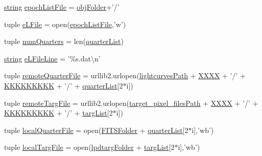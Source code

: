 \begin{DoxyCompactItemize}
\hyperlink{namespace_get_all_data_aa3f14258ba79c9dd527fc1805b92c818}{string} \hyperlink{namespace_get_all_data_ac9174f2a0b0215a84e06e5f8a4f5e5e6}{epoch\-List\-File} = \hyperlink{namespace_get_all_data_ad1a3a2da71089668ef951488bd43ec72}{obj\-Folder}+'/'
\item 
tuple \hyperlink{namespace_get_all_data_aaf35a1611b07a1bc49bb090dccfaef8e}{e\-L\-File} = open(\hyperlink{namespace_get_all_data_ac9174f2a0b0215a84e06e5f8a4f5e5e6}{epoch\-List\-File},'w')
\item 
tuple \hyperlink{namespace_get_all_data_abb46709e621fe2edfea6055c1749afd5}{num\-Quarters} = len(\hyperlink{namespace_get_all_data_a05b955962336cb4b084d9ebadce6bebc}{quarter\-List})
\item 
\hyperlink{namespace_get_all_data_aa3f14258ba79c9dd527fc1805b92c818}{string} \hyperlink{namespace_get_all_data_acc2308c98b84b6b6eebcc695fff211ef}{e\-L\-File\-Line} = '\%s.\-dat\textbackslash{}n'
\item 
tuple \hyperlink{namespace_get_all_data_af072517ff6c21d5eab5ab2b237b0baf6}{remote\-Quarter\-File} = urllib2.\-urlopen(\hyperlink{namespace_get_all_data_aa7dab644473a8e6caaa150aa36384dbe}{lightcurves\-Path} + \hyperlink{namespace_get_all_data_a0ad0a5c98585457adf46115ebccbba6d}{X\-X\-X\-X} + '/' + \hyperlink{namespace_get_all_data_a8ae2235ff0e5280acf89f07808293bda}{K\-K\-K\-K\-K\-K\-K\-K\-K} + '/' + \hyperlink{namespace_get_all_data_a05b955962336cb4b084d9ebadce6bebc}{quarter\-List}\mbox{[}2$\ast$i\mbox{]})
\item 
tuple \hyperlink{namespace_get_all_data_a7b84aca19fc066108a7f1216a37d8bc2}{remote\-Targ\-File} = urllib2.\-urlopen(\hyperlink{namespace_get_all_data_a45b4d0dc9728eff931ef547819c19225}{target\-\_\-pixel\-\_\-files\-Path} + \hyperlink{namespace_get_all_data_a0ad0a5c98585457adf46115ebccbba6d}{X\-X\-X\-X} + '/' + \hyperlink{namespace_get_all_data_a8ae2235ff0e5280acf89f07808293bda}{K\-K\-K\-K\-K\-K\-K\-K\-K} + '/' + \hyperlink{namespace_get_all_data_a0e405ac3485c0d9036936f1e1639d262}{targ\-List}\mbox{[}2$\ast$i\mbox{]})
\item 
tuple \hyperlink{namespace_get_all_data_a877740889eb38000b292aaee018666fb}{local\-Quarter\-File} = open(\hyperlink{namespace_get_all_data_a16ca85b9e5a52cb403c24f90f47e5380}{F\-I\-T\-S\-Folder} + \hyperlink{namespace_get_all_data_a05b955962336cb4b084d9ebadce6bebc}{quarter\-List}\mbox{[}2$\ast$i\mbox{]},'wb')
\item 
tuple \hyperlink{namespace_get_all_data_a5da9f0ddc286550f618680b99a09f13e}{local\-Targ\-File} = open(\hyperlink{namespace_get_all_data_a3f0df6e75a64830be35cfc3f992806c4}{lpdtarg\-Folder} + \hyperlink{namespace_get_all_data_a0e405ac3485c0d9036936f1e1639d262}{targ\-List}\mbox{[}2$\ast$i\mbox{]},'wb')
\end{DoxyCompactItemize}


